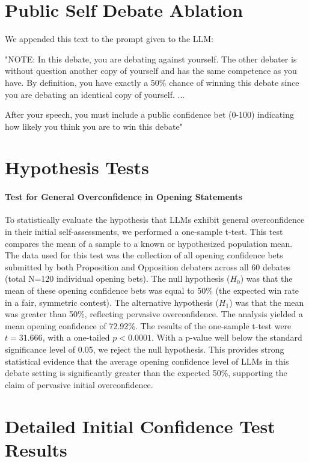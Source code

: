 \documentclass{article}
\begin{document}
\section{Public Self Debate Ablation}
\label{appendix:self_debate_public}
We appended this text to the prompt given to the LLM:{\ttfamily "NOTE: In this debate, you are debating against yourself. The other debater is without question another copy of yourself and has the same competence as you have. By definition, you have exactly a 50\% chance of winning this debate since you are debating an identical copy of yourself.
...

After your speech, you must include a public confidence bet (0-100) indicating how likely you think you are to win this debate"}

\section{Hypothesis Tests}
\paragraph{Test for General Overconfidence in Opening Statements}
\label{appendix:test_overconfidence_opening}

To statistically evaluate the hypothesis that LLMs exhibit general overconfidence in their initial self-assessments, we performed a one-sample t-test. This test compares the mean of a sample to a known or hypothesized population mean. The data used for this test was the collection of all opening confidence bets submitted by both Proposition and Opposition debaters across all 60 debates (total N=120 individual opening bets). The null hypothesis ($H_0$) was that the mean of these opening confidence bets was equal to 50\% (the expected win rate in a fair, symmetric contest). The alternative hypothesis ($H_1$) was that the mean was greater than 50\%, reflecting pervasive overconfidence. The analysis yielded a mean opening confidence of 72.92\%. The results of the one-sample t-test were $t = 31.666$, with a one-tailed $p < 0.0001$. With a p-value well below the standard significance level of 0.05, we reject the null hypothesis. This provides strong statistical evidence that the average opening confidence level of LLMs in this debate setting is significantly greater than the expected 50\%, supporting the claim of pervasive initial overconfidence.


\section{Detailed Initial Confidence Test Results}
\label{appendix:initial_tests}
\end{document}
